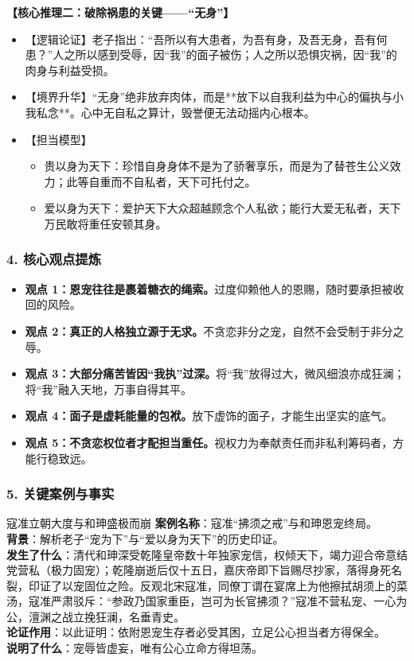 \noindent\textbf{【核心推理二：破除祸患的关键——“无身”】}
\begin{itemize}
    \item 【逻辑论证】老子指出：“吾所以有大患者，为吾有身，及吾无身，吾有何患？”人之所以感到受辱，因“我”的面子被伤；人之所以恐惧灾祸，因“我”的肉身与利益受损。
    \item 【境界升华】“无身”绝非放弃肉体，而是**放下以自我利益为中心的偏执与小我私念**。心中无自私之算计，毁誉便无法动摇内心根本。
    \item 【担当模型】
    \begin{itemize}
        \item 贵以身为天下：珍惜自身身体不是为了骄奢享乐，而是为了替苍生公义效力；此等自重而不自私者，天下可托付之。
        \item 爱以身为天下：爱护天下大众超越顾念个人私欲；能行大爱无私者，天下万民敢将重任安顿其身。
    \end{itemize}
\end{itemize}

\subsubsection{4. 核心观点提炼}
\begin{itemize}
    \item \textbf{观点 1：恩宠往往是裹着糖衣的绳索。}过度仰赖他人的恩赐，随时要承担被收回的风险。
    \item \textbf{观点 2：真正的人格独立源于无求。}不贪恋非分之宠，自然不会受制于非分之辱。
    \item \textbf{观点 3：大部分痛苦皆因“我执”过深。}将“我”放得过大，微风细浪亦成狂澜；将“我”融入天地，万事自得其平。
    \item \textbf{观点 4：面子是虚耗能量的包袱。}放下虚饰的面子，才能生出坚实的底气。
    \item \textbf{观点 5：不贪恋权位者才配担当重任。}视权力为奉献责任而非私利筹码者，方能行稳致远。
\end{itemize}

\subsubsection{5. 关键案例与事实}
\begin{CaseBox}{寇准立朝大度与和珅盛极而崩}
\textbf{案例名称}：寇准“拂须之戒”与和珅恩宠终局。\\
\textbf{背景}：解析老子“宠为下”与“爱以身为天下”的历史印证。\\
\textbf{发生了什么}：清代和珅深受乾隆皇帝数十年独家宠信，权倾天下，竭力迎合帝意结党营私（极力固宠）；乾隆崩逝后仅十五日，嘉庆帝即下旨赐尽抄家，落得身死名裂，印证了以宠固位之险。反观北宋寇准，同僚丁谓在宴席上为他擦拭胡须上的菜汤，寇准严肃驳斥：“参政乃国家重臣，岂可为长官拂须？”寇准不营私宠、一心为公，澶渊之战立挽狂澜，名垂青史。\\
\textbf{论证作用}：以此证明：依附恩宠生存者必受其困，立足公心担当者方得保全。\\
\textbf{说明了什么}：宠辱皆虚妄，唯有公心立命方得坦荡。
\end{CaseBox}

